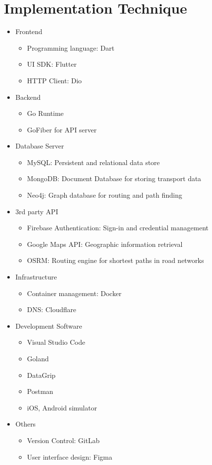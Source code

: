 \section{Implementation Technique}
\begin{itemize}
	\item Frontend
	\begin{itemize}
		\item Programming language: Dart
		\item UI SDK: Flutter
		\item HTTP Client: Dio
	\end{itemize}
	\item Backend
		\begin{itemize}
		\item Go Runtime
		\item GoFiber for API server
	\end{itemize}
	\item Database Server
	\begin{itemize}
		\item MySQL: Persistent and relational data store
		\item MongoDB: Document Database for storing transport data
		\item Neo4j: Graph database for routing and path finding
	\end{itemize}
	\newpage
	\item 3rd party API
	\begin{itemize}
		\item Firebase Authentication: Sign-in and credential management
		\item Google Maps API: Geographic information retrieval
		\item OSRM: Routing engine for shortest paths in road networks
	\end{itemize}
	\item Infrastructure
	\begin{itemize}
		\item Container management: Docker
		\item DNS: Cloudflare
	\end{itemize}
	\item Development Software
	\begin{itemize}
		\item Visual Studio Code
		\item Goland
		\item DataGrip
		\item Postman
		\item iOS, Android simulator
	\end{itemize}
	\item Others
	\begin{itemize}
		\item Version Control: GitLab
		\item User interface design: Figma
	\end{itemize}
\end{itemize}

